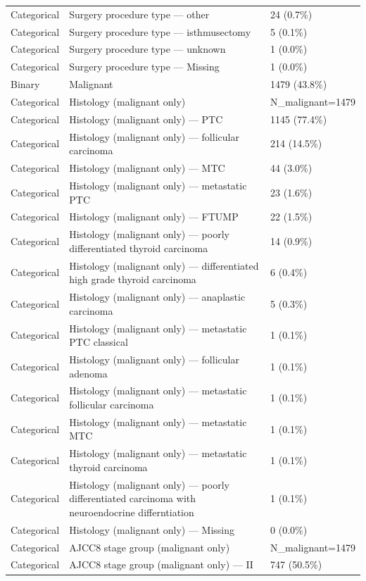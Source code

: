 \begin{table}[htbp]
\begin{tabular}{lll}
Categorical & Surgery procedure type — other & 24 (0.7\%) \\
Categorical & Surgery procedure type — isthmusectomy & 5 (0.1\%) \\
Categorical & Surgery procedure type — unknown & 1 (0.0\%) \\
Categorical & Surgery procedure type — Missing & 1 (0.0\%) \\
Binary & Malignant & 1479 (43.8\%) \\
Categorical & Histology (malignant only) & N\_malignant=1479 \\
Categorical & Histology (malignant only) — PTC & 1145 (77.4\%) \\
Categorical & Histology (malignant only) — follicular carcinoma & 214 (14.5\%) \\
Categorical & Histology (malignant only) — MTC & 44 (3.0\%) \\
Categorical & Histology (malignant only) — metastatic PTC & 23 (1.6\%) \\
Categorical & Histology (malignant only) — FTUMP & 22 (1.5\%) \\
Categorical & Histology (malignant only) — poorly differentiated thyroid carcinoma & 14 (0.9\%) \\
Categorical & Histology (malignant only) — differentiated high grade thyroid carcinoma & 6 (0.4\%) \\
Categorical & Histology (malignant only) — anaplastic carcinoma & 5 (0.3\%) \\
Categorical & Histology (malignant only) — metastatic PTC classical & 1 (0.1\%) \\
Categorical & Histology (malignant only) — follicular adenoma & 1 (0.1\%) \\
Categorical & Histology (malignant only) — metastatic follicular carcinoma & 1 (0.1\%) \\
Categorical & Histology (malignant only) — metastatic MTC & 1 (0.1\%) \\
Categorical & Histology (malignant only) — metastatic thyroid carcinoma & 1 (0.1\%) \\
Categorical & Histology (malignant only) — poorly differentiated carcinoma with neuroendocrine differntiation & 1 (0.1\%) \\
Categorical & Histology (malignant only) — Missing & 0 (0.0\%) \\
Categorical & AJCC8 stage group (malignant only) & N\_malignant=1479 \\
Categorical & AJCC8 stage group (malignant only) — II & 747 (50.5\%) \\

\end{tabular}
\end{table}

